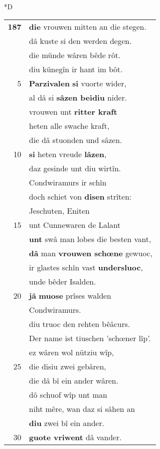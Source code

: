 \documentclass[8pt,a4paper,notitlepage]{article}
\begin{document}
\begin{table}[ht]
\begin{minipage}[t]{0.5\linewidth}
\small
\begin{center}*D
\end{center}
\begin{tabular}{rl}
\textbf{187} & \textbf{die} vrouwen mitten an die stegen.\\ 
 & dâ kuste si den werden degen.\\ 
 & die münde wâren bêde rôt.\\ 
 & diu künegîn ir hant im bôt.\\ 
5 & \textbf{Parzivalen} \textbf{si} vuorte wider,\\ 
 & al dâ si \textbf{sâzen beidiu} nider.\\ 
 & vrouwen unt \textbf{ritter kraft}\\ 
 & heten alle swache kraft,\\ 
 & die dâ stuonden und sâzen.\\ 
10 & \textbf{si} heten vreude \textbf{lâzen},\\ 
 & daz gesinde unt diu wirtîn.\\ 
 & Condwiramurs ir schîn\\ 
 & doch schiet von \textbf{disen} strîten:\\ 
 & Jeschuten, Eniten\\ 
15 & unt Cunnewaren de Lalant\\ 
 & \textbf{unt} swâ man lobes die besten vant,\\ 
 & \textbf{dâ} man \textbf{vrouwen schœne} gewuoc,\\ 
 & ir glastes schîn vast \textbf{undersluoc},\\ 
 & unde bêder Isalden.\\ 
20 & \textbf{jâ} \textbf{muose} prîses walden\\ 
 & Condwiramurs.\\ 
 & diu truoc den rehten bêâcurs.\\ 
 & Der name ist tiuschen 'schœner lîp'.\\ 
 & ez wâren wol nütziu wîp,\\ 
25 & die disiu zwei gebâren,\\ 
 & die dâ bî ein ander wâren.\\ 
 & dô schuof wîp unt man\\ 
 & niht mêre, wan daz si sâhen an\\ 
 & \textbf{diu} zwei bî ein ander.\\ 
30 & \textbf{guote vriwent} dâ vander.\\ 

\end{tabular}
\end{minipage}
\end{table}
\end{document}
